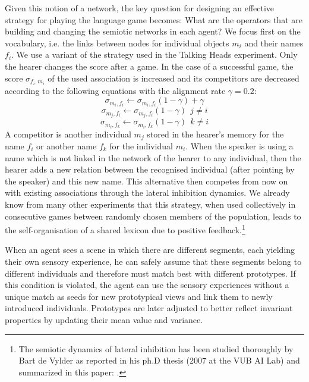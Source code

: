Given this notion of a network, the key question for designing an effective 
strategy for playing the language game becomes: What are the operators that are building and
changing the semiotic networks in each agent? We focus first on the
vocabulary, i.e. the links between nodes for individual objects $m_i$ and their 
names $f_i$. We use a variant of the strategy used in the Talking Heads experiment. 
Only the hearer changes the score after a game. 
In the case of a successful game, the score $\sigma_{f_i,m_i}$ of the used association is 
increased and its competitors are decreased according to the following
equations with the alignment rate $\gamma = 0.2$: 
\begin{equation}
 \sigma_{m_i,f_i} \leftarrow \sigma_{m_i,f_i} (1-\gamma) + \gamma
\end{equation}
\begin{equation}
 \sigma_{m_j,f_i} \leftarrow \sigma_{m_j,f_i} (1-\gamma) ~~j \neq i
\end{equation}
\begin{equation}
 \sigma_{m_i,f_k} \leftarrow \sigma_{m_i,f_k} (1-\gamma) ~~k \neq i
\end{equation}
A competitor is another individual $m_j$ stored in the hearer's memory 
for the name $f_i$ or another name $f_k$ for the individual 
$m_i$. When the speaker is using a name which is not linked in the network 
of the hearer to any individual, then the hearer adds a new relation between 
the recognised individual (after pointing by the speaker) and this new name. 
This alternative then competes from 
now on with existing associations through the lateral inhibition dynamics. 
We already know from many other experiments that this strategy, when used collectively in 
consecutive games between randomly chosen members of the population, leads to the  
self-organisation of a shared lexicon due to positive feedback.\footnote{
The semiotic dynamics of lateral inhibition has been studied thoroughly by Bart de Vylder as reported in his ph.D thesis 
(2007 at the VUB AI Lab) and summarized in this paper: \cite{deVylder:2006}.}
 
When an agent sees a scene in which there are different segments, each yielding their own sensory
experience, he can safely assume that these segments belong to 
different individuals and therefore must match best with 
different prototypes. If this condition is violated, the agent
can use the sensory experiences without a unique match as seeds for new
prototypical views and link them to newly introduced individuals.  
Prototypes are later adjusted to better reflect invariant properties by updating their 
mean value and variance. 

